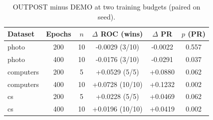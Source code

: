 \begin{table}[t]
\centering
\small
\begin{tabular}{lccccc}
\toprule
Dataset & Epochs & $n$ & $\Delta$ ROC (wins) & $\Delta$ PR & $p$ (PR) \\
\midrule
photo & 200 & 10 & -0.0029 (3/10) & -0.0022 & 0.557 \\
photo & 400 & 10 & -0.0176 (3/10) & -0.0291 & 0.037 \\
computers & 200 & 5 & +0.0529 (5/5) & +0.0880 & 0.062 \\
computers & 400 & 10 & +0.0728 (10/10) & +0.1232 & 0.002 \\
cs & 200 & 5 & +0.0228 (5/5) & +0.0469 & 0.062 \\
cs & 400 & 10 & +0.0196 (10/10) & +0.0419 & 0.002 \\
\bottomrule
\end{tabular}
\caption{OUTPOST minus DEMO at two training budgets (paired on seed).}
\label{tab:epochs}
\end{table}

